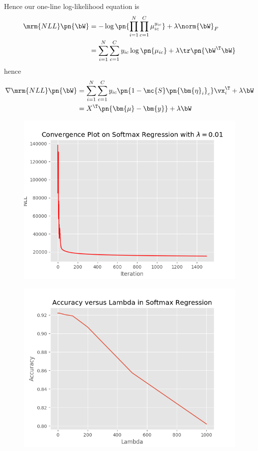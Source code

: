 \documentclass[189]{pset}
\begin{document}
\begin{enumerate}
        Hence our one-line log-likelihood equation is
        \begin{align*}
          \mrm{NLL}\pn{\bW}
          &= -\log \pn{\prod_{i=1}^N \prod_{c=1}^C \mu_{ic}^{y_{ic}}}
            + \lambda \norm{\bW}_F \\
          &= \sum_{i=1}^N \sum_{c=1}^C y_{ic} \log\pn{\mu_{ic}} +
            \lambda \tr\pn{\bW^\T \bW}
        \end{align*}
        hence
        \begin{align*}
          \nabla \mrm{NLL}\pn{\bW}
          &= \sum_{i=1}^N \sum_{c=1}^C y_{ic} \pn{1 -
            \mc{S}\pn{\bm{\eta}_i}_c} \vx_i^\T + \lambda \bW \\
          &= X^\T \pn{\bm{\mu} - \bm{y}} + \lambda \bW
        \end{align*}
        \begin{figure}[H]
          \centering
          \includegraphics{hw4pr2b_convergence.png}
        \end{figure}
        \begin{figure}[H]
          \centering
          \includegraphics{hw4pr2b_lva.png}
        \end{figure}
    \end{enumerate}
\end{document}
